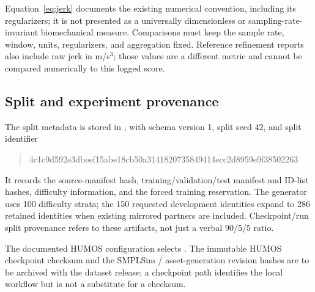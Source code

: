 Equation~\eqref{eq:jerk} documents the existing numerical convention, including
its regularizers; it is not presented as a universally dimensionless or
sampling-rate-invariant biomechanical measure. Comparisons must keep the
sample rate, window, units, regularizers, and aggregation fixed. Reference
refinement reports also include raw jerk in m/s$^3$; those values are a
different metric and cannot be compared numerically to this logged score.

\subsection{Split and experiment provenance}\label{app:provenance}

The split metadata is stored in
, with schema version 1,
split seed 42, and split identifier
\begin{quote}
\footnotesize\ttfamily
4c1c9d592e3dbeef15abe18cb50a3141820735849414ecc2d8959e9f38502263
\end{quote}
It records the source-manifest hash, training/validation/test manifest and
ID-list hashes, difficulty information, and the forced training reservation.
The generator uses 100 difficulty strata; the 150 requested development
identities expand to 286 retained identities when existing mirrored partners
are included. Checkpoint/run split provenance refers to these artifacts,
not just a verbal 90/5/5 ratio.

The documented HUMOS configuration selects
. The immutable
HUMOS checkpoint checksum and the SMPLSim / asset-generation revision hashes
are to be archived with the dataset release; a checkpoint path identifies the
local workflow but is not a substitute for a checksum.


